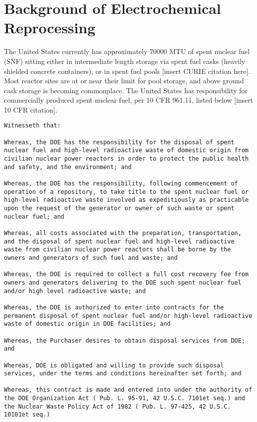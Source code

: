 \chapter{Background of Electrochemical Reprocessing} \label{ch:background}

The United States currently has approximately 70000 MTU of spent nuclear fuel (SNF) sitting either in intermediate length storage via spent fuel casks (heavily shielded concrete containers), or in spent fuel pools [insert CURIE citation here]. Most reactor sites are at or near their limit for pool storage, and above ground cask storage is becoming commonplace. The United States has responsibility for commercially produced spent nuclear fuel, per 10 CFR 961.11, listed below [insert 10 CFR citation]. \\

\begin{lstlisting}
Witnesseth that:

Whereas, the DOE has the responsibility for the disposal of spent nuclear fuel and high-level radioactive waste of domestic origin from civilian nuclear power reactors in order to protect the public health and safety, and the environment; and

Whereas, the DOE has the responsibility, following commencement of operation of a repository, to take title to the spent nuclear fuel or high-level radioactive waste involved as expeditiously as practicable upon the request of the generator or owner of such waste or spent nuclear fuel; and

Whereas, all costs associated with the preparation, transportation, and the disposal of spent nuclear fuel and high-level radioactive waste from civilian nuclear power reactors shall be borne by the owners and generators of such fuel and waste; and

Whereas, the DOE is required to collect a full cost recovery fee from owners and generators delivering to the DOE such spent nuclear fuel and/or high level radioactive waste; and

Whereas, the DOE is authorized to enter into contracts for the permanent disposal of spent nuclear fuel and/or high-level radioactive waste of domestic origin in DOE facilities; and

Whereas, the Purchaser desires to obtain disposal services from DOE; and

Whereas, DOE is obligated and willing to provide such disposal services, under the terms and conditions hereinafter set forth; and

Whereas, this contract is made and entered into under the authority of the DOE Organization Act ( Pub. L. 95-91, 42 U.S.C. 7101et seq.) and the Nuclear Waste Policy Act of 1982 ( Pub. L. 97-425, 42 U.S.C. 10101et seq.)

\end{lstlisting}

